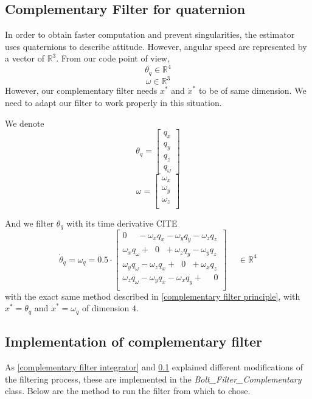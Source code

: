 \documentclass[a4paper,10pt]{article}
\begin{document}
\subsection{Complementary Filter for quaternion}
\label{complementary filter quaternion}
In order to obtain faster computation and prevent singularities, the estimator uses quaternions \cite{4} to describe attitude. However, angular speed are represented by a vector of $\mathbb{R}^3$. From our code point of view,
$$\theta_q \in\mathbb{R}^4$$
$$\omega \in\mathbb{R}^3$$
However, our complementary filter needs $x^*$ and $ \dot x^*$ to be of same dimension. We need to adapt our filter to work properly in this situation.

\medskip
We denote
$$\theta_q = \begin{bmatrix}  q_x\\ q_y\\ q_z\\  q_{\omega}      \end{bmatrix}$$
$$\omega = \begin{bmatrix}  \omega_x\\ \omega_y\\ \omega_z\\    \end{bmatrix}$$

And we filter $\theta_q$ with its time derivative CITE
$$ \dot \theta_q = \omega_q = 0.5 \cdot \begin{bmatrix}  
 0 \hspace{15pt}  -  \omega_x q_x    -   \omega_y q_y   -   \omega_z q_z\\
\omega_x q_\omega + \hspace{7pt} 0 \hspace{7pt} + \omega_z q_y - \omega_y q_z\\
\omega_y q_\omega - \omega_z q_x + \hspace{7pt} 0 \hspace{7pt} + \omega_x q_z \\   
\omega_z q_\omega - \omega_y q_x - \omega_x q_y + \hspace{15pt} 0 \\   

    \end{bmatrix} \hspace{15pt} \in\mathbb{R}^4$$
with the exact same method described in \ref{complementary filter principle}, with $x^* = \theta_q$ and $ \dot x^* = \omega_q$ of dimension $4$.

\subsection{Implementation of complementary filter}
As \ref{complementary filter integrator} and \ref{complementary filter quaternion} explained different modifications of the filtering process, these are implemented in the \textit{Bolt\_Filter\_Complementary} class. Below are the method to run the filter from which to chose.
\end{document}
